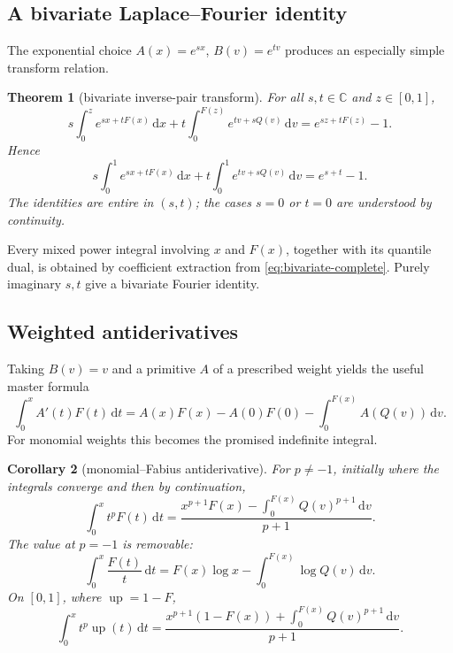 \documentclass[11pt,oneside]{article}
\newtheorem{theorem}{Theorem}[section]
\newtheorem{corollary}[theorem]{Corollary}
\theoremstyle{definition}
\newcommand{\F}{F}
\newcommand{\Q}{Q}
\newcommand{\upf}{\operatorname{up}}
\newcommand{\C}{\mathbb C}
\newcommand{\dd}{\,\mathrm d}
\begin{document}
\subsection{A bivariate Laplace--Fourier identity}

The exponential choice \(A(x)=e^{sx}\), \(B(v)=e^{tv}\) produces an especially
simple transform relation.

\begin{theorem}[bivariate inverse-pair transform]\label{thm:bivariate-exp}
For all \(s,t\in\C\) and \(z\in[0,1]\),
\begin{equation}\label{eq:bivariate-incomplete}
 s\int_0^z e^{sx+t\F(x)}\dd x
 +t\int_0^{\F(z)}e^{tv+s\Q(v)}\dd v
 =e^{sz+t\F(z)}-1.
\end{equation}
Hence
\begin{equation}\label{eq:bivariate-complete}
 s\int_0^1e^{sx+t\F(x)}\dd x
 +t\int_0^1e^{tv+s\Q(v)}\dd v
 =e^{s+t}-1.
\end{equation}
The identities are entire in \((s,t)\); the cases \(s=0\) or \(t=0\) are understood
by continuity.
\end{theorem}

Every mixed power integral involving \(x\) and \(\F(x)\), together with its quantile
dual, is obtained by coefficient extraction from \cref{eq:bivariate-complete}.  Purely
imaginary \(s,t\) give a bivariate Fourier identity.

\subsection{Weighted antiderivatives}

Taking \(B(v)=v\) and a primitive \(A\) of a prescribed weight yields the useful
master formula
\begin{equation}\label{eq:weighted-antiderivative-master}
 \int_0^x A'(t)\F(t)\dd t
 =A(x)\F(x)-A(0)\F(0)-\int_0^{\F(x)}A(\Q(v))\dd v.
\end{equation}
For monomial weights this becomes the promised indefinite integral.

\begin{corollary}[monomial--Fabius antiderivative]\label{cor:monomial-F}
For \(p\ne-1\), initially where the integrals converge and then by continuation,
\begin{equation}\label{eq:monomial-F-antiderivative}
 \int_0^x t^p\F(t)\dd t
 =\frac{x^{p+1}\F(x)-\displaystyle\int_0^{\F(x)}\Q(v)^{p+1}\dd v}{p+1}.
\end{equation}
The value at \(p=-1\) is removable:
\begin{equation}\label{eq:F-over-x-incomplete}
 \int_0^x\frac{\F(t)}t\dd t
 =\F(x)\log x-\int_0^{\F(x)}\log\Q(v)\dd v.
\end{equation}
On \([0,1]\), where \(\upf=1-\F\),
\begin{equation}\label{eq:monomial-up-half-antiderivative}
 \int_0^x t^p\upf(t)\dd t
 =\frac{x^{p+1}(1-\F(x))+\displaystyle\int_0^{\F(x)}\Q(v)^{p+1}\dd v}{p+1}.
\end{equation}
\end{corollary}
\end{document}
